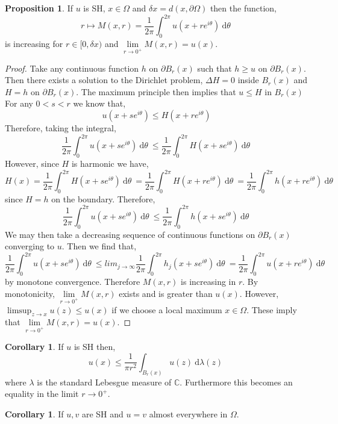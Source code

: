 \documentclass[12pt]{extarticle}
\newcommand{\C}{\mathbb{C}}
\renewcommand{\d}[1]{\: \mathrm{d}#1 \:}
\theoremstyle{definition}
\newtheorem{proposition}[theorem]{Proposition}
\newtheorem{corollary}[theorem]{Corollary}
\begin{document}
\begin{proposition}
If $u$ is SH, $x \in \Omega$ and $\delta x = d(x, \partial \Omega)$ then the function,
\[ r \mapsto M(x, r) = \frac{1}{2 \pi} \int_0^{2 \pi} u(x + r e^{i \theta}) \d{\theta} \]
is increasing for $r \in [0, \delta x)$ and $\lim\limits_{r \to 0^{+}} M(x, r) = u(x)$. 
\end{proposition}

\begin{proof}
Take any continuous function $h$ on $\partial B_r(x)$ such that $h \ge u$ on $\partial B_r(x)$. Then there exists a solution to the Dirichlet problem, $\Delta H = 0$ inside $B_r(x)$ and $H = h$ on $\partial B_r(x)$. The maximum principle then implies that $u \le H$ in $B_r(x)$ For any $0 < s < r$ we know that,
\[ u(x + s e^{i \theta}) \le H(x + re^{i \theta}) \]
Therefore, taking the integral,
\[ \frac{1}{2 \pi} \int_0^{2 \pi} u(x + se^{i \theta}) \d{\theta} \le \frac{1}{2 \pi} \int_0^{2 \pi} H(x + s e^{i \theta}) \d{\theta} \]
However, since $H$ is harmonic we have,
\[ H(x) = \frac{1}{2 \pi} \int_0^{2 \pi} H(x + s e^{i \theta}) \d{\theta} = \frac{1}{2 \pi} \int_0^{2 \pi} H(x + r e^{i \theta}) \d{\theta} = \frac{1}{2 \pi} \int_0^{2 \pi} h(x + r e^{i \theta}) \d{\theta} \]
since $H = h$ on the boundary. Therefore,
\[ \frac{1}{2 \pi} \int_0^{2 \pi} u(x + se^{i \theta}) \d{\theta} \le \frac{1}{2 \pi} \int_0^{2 \pi} h(x + se^{i \theta}) \d{\theta} \] 
We may then take a decreasing sequence of continuous functions on $\partial B_r(x)$ converging to $u$. Then we find that,
\[ \frac{1}{2 \pi} \int_0^{2 \pi} u(x + se^{i \theta}) \d{\theta} \le lim_{j \to \infty} \frac{1}{2 \pi} \int_0^{2 \pi} h_j(x + se^{i \theta}) \d{\theta} = \frac{1}{2 \pi} \int_0^{2 \pi} u(x + r e^{i \theta}) \d{\theta} \] 
by monotone convergence. Therefore $M(x, r)$ is increasing in $r$. By monotonicity, $\lim\limits_{r \to 0^{+}} M(x, r)$ exists and is greater than $u(x)$. However, $\limsup_{z \to x} u(z) \le u(x)$ if we choose a local maximum $x \in \Omega$. These imply that $\lim\limits_{r \to 0^{+}} M(x, r) = u(x)$. 
\end{proof}

\begin{corollary}
If $u$ is SH then,
\[ u(x) \le \frac{1}{\pi r^2} \int_{B_r(x)} u(z) \d{\lambda(z)} \]
where $\lambda$ is the standard Lebesgue measure of $\C$. Furthermore this becomes an equality in the limit $r \to 0^{+}$. 
\end{corollary}

\begin{corollary}
If $u, v$ are SH and $u = v$ almost everywhere in $\Omega$.
\end{corollary}
\end{document}
